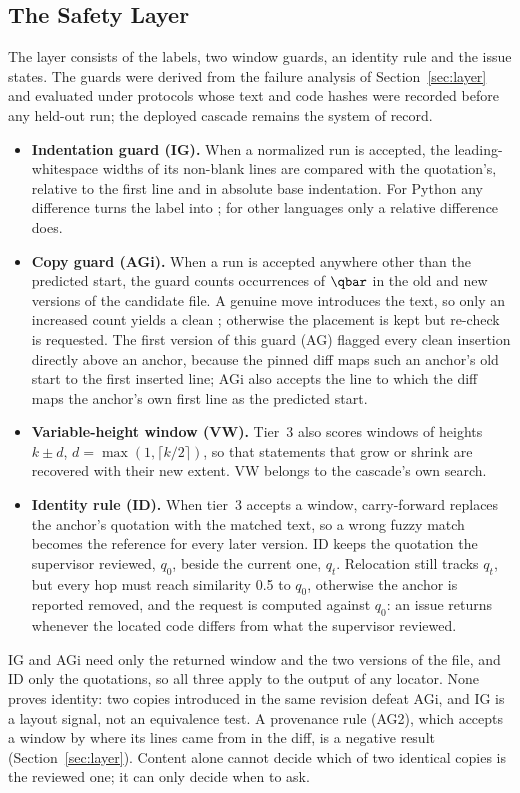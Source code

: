 \subsection{The Safety Layer}\label{sec:guards}
The layer consists of the labels, two window guards, an identity rule and the issue states. The guards were derived from the failure analysis of Section~\ref{sec:layer} and evaluated under protocols whose text and code hashes were recorded before any held-out run; the deployed cascade remains the system of record.
\begin{itemize}
\item \textbf{Indentation guard (IG).} When a normalized run is accepted, the leading-whitespace widths of its non-blank lines are compared with the quotation's, relative to the first line and in absolute base indentation. For Python any difference turns the label into ; for other languages only a relative difference does.
\item \textbf{Copy guard (AGi).} When a run is accepted anywhere other than the predicted start, the guard counts occurrences of $\qbar$ in the old and new versions of the candidate file. A genuine move introduces the text, so only an increased count yields a clean ; otherwise the placement is kept but re-check is requested. The first version of this guard (AG) flagged every clean insertion directly above an anchor, because the pinned diff maps such an anchor's old start to the first inserted line; AGi also accepts the line to which the diff maps the anchor's own first line as the predicted start.
\item \textbf{Variable-height window (VW).} Tier~3 also scores windows of heights $k\pm d$, $d=\max(1,\lceil k/2\rceil)$, so that statements that grow or shrink are recovered with their new extent. VW belongs to the cascade's own search.
\item \textbf{Identity rule (ID).} When tier~3 accepts a  window, carry-forward replaces the anchor's quotation with the matched text, so a wrong fuzzy match becomes the reference for every later version. ID keeps the quotation the supervisor reviewed, $q_0$, beside the current one, $q_t$. Relocation still tracks $q_t$, but every  hop must reach similarity 0.5 to $q_0$, otherwise the anchor is reported removed, and the request is computed against $q_0$: an issue returns whenever the located code differs from what the supervisor reviewed.
\end{itemize}
IG and AGi need only the returned window and the two versions of the file, and ID only the quotations, so all three apply to the output of any locator. None proves identity: two copies introduced in the same revision defeat AGi, and IG is a layout signal, not an equivalence test. A provenance rule (AG2), which accepts a window by where its lines came from in the diff, is a negative result (Section~\ref{sec:layer}). Content alone cannot decide which of two identical copies is the reviewed one; it can only decide when to ask.

